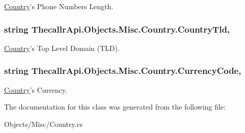\hyperlink{class_thecallr_api_1_1_objects_1_1_misc_1_1_country}{Country}'s Phone Numbers Length. 

\hypertarget{class_thecallr_api_1_1_objects_1_1_misc_1_1_country_a16fc0547d9f55b21c13c190f2dea6325}{
\subsubsection[{Country\+Tld}]{\setlength{\rightskip}{0pt plus 5cm}string Thecallr\+Api.\+Objects.\+Misc.\+Country.\+Country\+Tld\hspace{0.3cm}{\ttfamily [get]}, {\ttfamily [set]}}}\label{class_thecallr_api_1_1_objects_1_1_misc_1_1_country_a16fc0547d9f55b21c13c190f2dea6325}


\hyperlink{class_thecallr_api_1_1_objects_1_1_misc_1_1_country}{Country}'s Top Level Domain (T\+L\+D). 

\hypertarget{class_thecallr_api_1_1_objects_1_1_misc_1_1_country_a4d6c39835cde4c1ba5f6f965bb7f50fb}{
\subsubsection[{Currency\+Code}]{\setlength{\rightskip}{0pt plus 5cm}string Thecallr\+Api.\+Objects.\+Misc.\+Country.\+Currency\+Code\hspace{0.3cm}{\ttfamily [get]}, {\ttfamily [set]}}}\label{class_thecallr_api_1_1_objects_1_1_misc_1_1_country_a4d6c39835cde4c1ba5f6f965bb7f50fb}


\hyperlink{class_thecallr_api_1_1_objects_1_1_misc_1_1_country}{Country}'s Currency. 



The documentation for this class was generated from the following file\+:\begin{DoxyCompactItemize}
\item 
Objects/\+Misc/Country.\+cs\end{DoxyCompactItemize}
